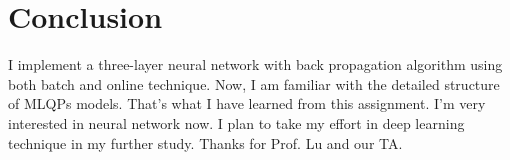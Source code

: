 \section{Conclusion}
I implement a three-layer neural network with back propagation algorithm using both batch and online technique.
Now, I am familiar with the detailed structure of MLQPs models. That's what I have learned from this assignment. I'm very interested in neural network now. I plan to take my effort in deep learning technique in my further study. Thanks for Prof. Lu and our TA.
   